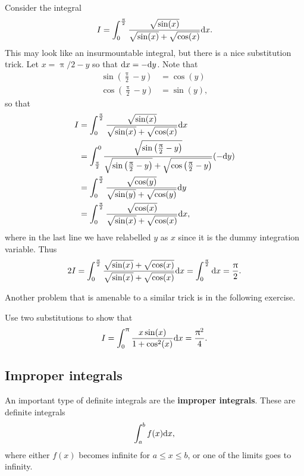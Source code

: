 \begin{ex}
Consider the integral 
\begin{equation*}
I=\int_{0}^{\frac{\uppi}{2}}\frac{\sqrt{\sin(x)}}{\sqrt{\sin(x)}+\sqrt{\cos(x)}}\mathrm{d} x.
\end{equation*}
This may look like an insurmountable integral, but there is a nice substitution trick.  Let $x=\uppi/2 -y$ so that $\mathrm{d} x=-\mathrm{d} y$. Note that 
\begin{align*}
\sin\left(\frac{\uppi}{2}-y\right)&=\cos(y)\\
\cos\left(\frac{\uppi}{2}-y\right)&=\sin(y),
\end{align*}
so that 
\begin{align*}
I&=\int_{0}^{\frac{\uppi}{2}}\frac{\sqrt{\sin(x)}}{\sqrt{\sin(x)}+\sqrt{\cos(x)}}\mathrm{d} x \\
&=\int_{\frac{\uppi}{2}}^{0}\frac{\sqrt{\sin\left(\frac{\uppi}{2}-y\right)}}{\sqrt{\sin\left(\frac{\uppi}{2}-y\right)}+\sqrt{\cos\left(\frac{\uppi}{2}-y\right)}}(-\mathrm{d} y)\\
&=\int_{0}^{\frac{\uppi}{2}}\frac{\sqrt{\cos(y)}}{\sqrt{\sin(y)}+\sqrt{\cos(y)}}\mathrm{d} y\\
&=\int_{0}^{\frac{\uppi}{2}}\frac{\sqrt{\cos(x)}}{\sqrt{\sin(x)}+\sqrt{\cos(x)}}\mathrm{d} x,
\end{align*}
where in the last line we have relabelled $y $ as $x$ since it is the dummy integration variable. Thus
\begin{equation*}
2I=\int_{0}^{\frac{\uppi}{2}}\frac{\sqrt{\sin(x)}+\sqrt{\cos(x)}}{\sqrt{\sin(x)}+\sqrt{\cos(x)}}\mathrm{d} x=\int_{0}^{\frac{\uppi}{2}}\mathrm{d} x =\frac{\uppi}{2}.
\end{equation*}
\end{ex}

Another problem that is amenable to a similar trick is in the following exercise.
\begin{exercise}
Use two  substitutions to show that 
\begin{equation*}
I=\int_{0}^{\uppi}\frac{x\sin(x)}{1+\cos^{2}(x)}\mathrm{d} x=\frac{\uppi^{2}}{4}.
\end{equation*}
\end{exercise}

\subsection*{Improper integrals}
An important type of definite integrals are the \textbf{improper integrals}. These are definite integrals
\begin{equation*}
\int_{a}^{b}f(x)\mathrm{d} x,
\end{equation*}
where either $f(x)$ becomes infinite for $a\leq x\leq b$, or one of the limits goes to infinity. \\

